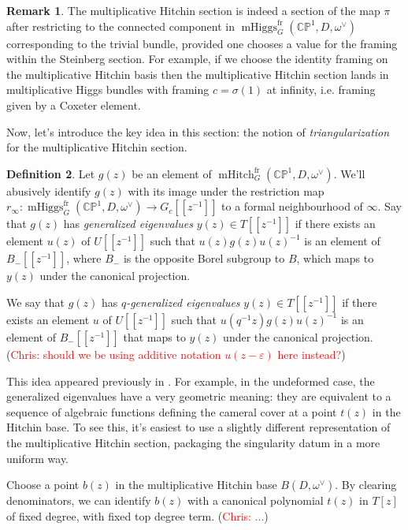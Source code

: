 \documentclass[11pt, oneside, reqno]{amsart}
\theoremstyle{definition} \newtheorem{definition}{Definition}[section]
\theoremstyle{definition} \newtheorem{remark}[definition]{Remark}
\theoremstyle{definition} \newtheorem{remarks}[definition]{Remarks}
\theoremstyle{definition} \newtheorem{question}[definition]{Question}
\theoremstyle{definition} \newtheorem*{note}{Note}
\theoremstyle{definition} \newtheorem{example}[definition]{Example}
\theoremstyle{definition} \newtheorem{examples}[definition]{Examples}
\newcommand{\bb}[1]{\mathbb{#1}}
\newcommand{\eps}{\varepsilon}
\DeclareMathOperator{\mhiggs}{mHiggs}
\DeclareMathOperator{\mhitch}{mHitch}
\newcommand{\fr}{\mathrm{fr}}
\newcommand{\chris}[1]{(\textcolor{red}{Chris: #1})}
\begin{document}
\begin{remark}
The multiplicative Hitchin section is indeed a section of the map $\pi$ after restricting to the connected component in $\mhiggs^\fr_G(\bb{CP}^1,D,\omega^\vee)$ corresponding to the trivial bundle, provided one chooses a value for the framing within the Steinberg section.  For example, if we choose the identity framing on the multiplicative Hitchin basis then the multiplicative Hitchin section lands in multiplicative Higgs bundles with framing $c = \sigma(1)$ at infinity, i.e. framing given by a Coxeter element.
\end{remark}

Now, let's introduce the key idea in this section: the notion of \emph{triangularization} for the multiplicative Hitchin section.
\begin{definition} \label{gen_evals_def}
Let $g(z)$ be an element of $\mhitch^\fr_G(\bb{CP}^1, D, \omega^\vee)$.  We'll abusively identify $g(z)$ with its image under the restriction map $r_\infty \colon \mhiggs_G^\fr(\bb{CP}^1,D,\omega^\vee) \to G_c[[z^{-1}]]$ to a formal neighbourhood of $\infty$.  Say that $g(z)$ has \emph{generalized eigenvalues} $y(z) \in T[[z^{-1}]]$ if there exists an element $u(z)$ of $U[[z^{-1}]]$ such that $u(z)g(z)u(z)^{-1}$ is an element of $B_-[[z^{-1}]]$, where $B_-$ is the opposite Borel subgroup to $B$, which maps to $y(z)$ under the canonical projection.

We say that $g(z)$ has \emph{$q$-generalized eigenvalues} $y(z) \in T[[z^{-1}]]$ if there exists an element $u$ of $U[[z^{-1}]]$ such that $u(q^{-1}z)g(z)u(z)^{-1}$ is an element of $B_-[[z^{-1}]]$ that maps to $y(z)$ under the canonical projection. \chris{should we be using additive notation $u(z-\eps)$ here instead?}
\end{definition}

This idea appeared previously in \cite{NekrasovPestun, NekrasovPestunShatashvili}.  For example, in the undeformed case, the generalized eigenvalues have a very geometric meaning: they are equivalent to a sequence of algebraic functions defining the cameral cover at a point $t(z)$ in the Hitchin base.  To see this, it's easiest to use a slightly different representation of the multiplicative Hitchin section, packaging the singularity datum in a more uniform way. 

Choose a point $b(z)$ in the multiplicative Hitchin base $B(D,\omega^\vee)$. By clearing denominators, we can identify $b(z)$ with a canonical polynomial $t(z)$ in $T[z]$ of fixed degree, with fixed top degree term. \chris{...}
 
\end{document}
